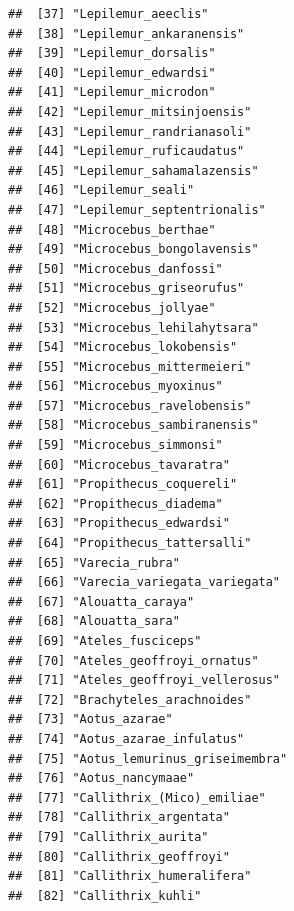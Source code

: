 \documentclass[]{article}
\begin{document}
\begin{verbatim}
##  [37] "Lepilemur_aeeclis"                            
##  [38] "Lepilemur_ankaranensis"                       
##  [39] "Lepilemur_dorsalis"                           
##  [40] "Lepilemur_edwardsi"                           
##  [41] "Lepilemur_microdon"                           
##  [42] "Lepilemur_mitsinjoensis"                      
##  [43] "Lepilemur_randrianasoli"                      
##  [44] "Lepilemur_ruficaudatus"                       
##  [45] "Lepilemur_sahamalazensis"                     
##  [46] "Lepilemur_seali"                              
##  [47] "Lepilemur_septentrionalis"                    
##  [48] "Microcebus_berthae"                           
##  [49] "Microcebus_bongolavensis"                     
##  [50] "Microcebus_danfossi"                          
##  [51] "Microcebus_griseorufus"                       
##  [52] "Microcebus_jollyae"                           
##  [53] "Microcebus_lehilahytsara"                     
##  [54] "Microcebus_lokobensis"                        
##  [55] "Microcebus_mittermeieri"                      
##  [56] "Microcebus_myoxinus"                          
##  [57] "Microcebus_ravelobensis"                      
##  [58] "Microcebus_sambiranensis"                     
##  [59] "Microcebus_simmonsi"                          
##  [60] "Microcebus_tavaratra"                         
##  [61] "Propithecus_coquereli"                        
##  [62] "Propithecus_diadema"                          
##  [63] "Propithecus_edwardsi"                         
##  [64] "Propithecus_tattersalli"                      
##  [65] "Varecia_rubra"                                
##  [66] "Varecia_variegata_variegata"                  
##  [67] "Alouatta_caraya"                              
##  [68] "Alouatta_sara"                                
##  [69] "Ateles_fusciceps"                             
##  [70] "Ateles_geoffroyi_ornatus"                     
##  [71] "Ateles_geoffroyi_vellerosus"                  
##  [72] "Brachyteles_arachnoides"                      
##  [73] "Aotus_azarae"                                 
##  [74] "Aotus_azarae_infulatus"                       
##  [75] "Aotus_lemurinus_griseimembra"                 
##  [76] "Aotus_nancymaae"                              
##  [77] "Callithrix_(Mico)_emiliae"                    
##  [78] "Callithrix_argentata"                         
##  [79] "Callithrix_aurita"                            
##  [80] "Callithrix_geoffroyi"                         
##  [81] "Callithrix_humeralifera"                      
##  [82] "Callithrix_kuhli"                             

\end{verbatim}
\end{document}

